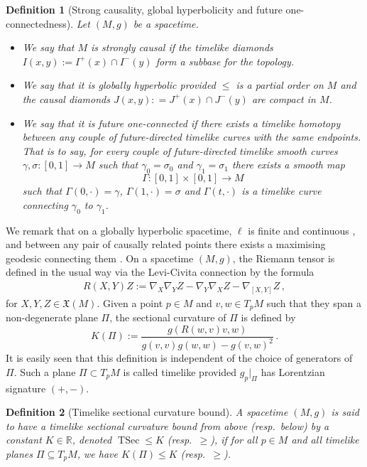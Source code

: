 \documentclass[hidelinks,12pt,a4paper]{article}
\numberwithin{equation}{section}
\theoremstyle{plain}
\newtheorem{definition}{Definition}[section]
\theoremstyle{definition}
\DeclareMathOperator{\TSec}{TSec}
\begin{document}
\begin{definition}[Strong causality, global hyperbolicity and future one-connectedness]
Let $(M,g)$ be a spacetime. 
\begin{itemize}
\item[(i)] We say that $M$ is strongly causal if the timelike diamonds $I(x,y):=I^+(x) \cap I^-(y)$ form a subbase for the topology.  
\item[(ii)] We say that it is globally hyperbolic provided $\leq$ is a partial order on $M$ and the causal diamonds $J(x,y) : = J^+(x) \cap J^-(y)$ are compact in $M$.
\item[(iii)] We say that it is future one-connected if there exists a timelike homotopy between any couple of future-directed timelike curves with the same endpoints. That is to say, for every couple of future-directed timelike smooth curves $\gamma, \sigma :[0,1] \rightarrow M$ such that $\gamma_0= \sigma_0$ and $\gamma_1=\sigma_1$ there exists a smooth map 
\[
\Gamma: [0,1] \times [0,1] \rightarrow M
\]
such that $\Gamma (0, \cdot)= \gamma$, $\Gamma(1, \cdot)= \sigma$ and $\Gamma(t, \cdot)$ is a timelike curve connecting $\gamma_0$ to $\gamma_1$.
\end{itemize}
\end{definition} 

We remark that on a globally hyperbolic spacetime, $\ell$ is finite and continuous \cite[Theorem 4.124]{Min19}, and between any pair of causally related points there exists a maximising geodesic connecting them \cite[Theorem 4.123]{Min19}. 
On a spacetime $(M,g)$, the Riemann tensor is defined in the usual way via the Levi-Civita connection by the formula
\begin{align}
R(X,Y)Z:=\nabla_X \nabla_Y Z - \nabla_Y \nabla_X Z - \nabla_{[X,Y]} Z \, ,
\end{align}
for $X,Y,Z \in \mathfrak{X}(M)$. 
Given a point $p \in M$ and $v,w \in T_pM$ such that they span a non-degenerate plane $\Pi$, the sectional curvature of $\Pi$ is defined by 
\begin{equation}
K(\Pi) := \frac{g(R(w,v)v,w)}{g(v,v) g(w,w) - g(v,w)^2} \, .
\end{equation}
It is easily seen that this definition is independent of the choice of generators of $\Pi$. 
Such a plane $\Pi \subset T_pM$ is called timelike provided $g_p |_{\Pi}$ has Lorentzian signature $(+,-)$.

\begin{definition}[Timelike sectional curvature bound]
\label{def: tl sec curv bd}
A spacetime $(M,g)$ is said to have a timelike sectional curvature bound from above (resp.\ below) by a constant $K \in \mathbb{R}$, denoted $\TSec \leq K$ (resp.\ $\geq$), if for all $p \in M$ and all timelike planes $\Pi \subseteq T_pM$, we have $K(\Pi) \leq K$ (resp.\ $\geq$).
\end{definition}
\end{document}
